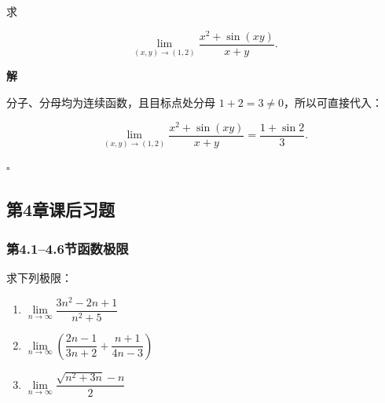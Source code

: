 \documentclass[fontset=fandol]{ctexart}
\newenvironment{solution}{\par\noindent\textbf{解}\quad}{\hfill$\square$\par\vspace{0.8em}}
\begin{document}
\begin{example}[利用连续性求极限]

	求

	\[

	\lim_{(x,y)\to(1,2)}

	\frac{x^2+\sin(xy)}{x+y}.

	\]

\end{example}

\begin{solution}

	分子、分母均为连续函数，且目标点处分母 \(1+2=3\neq0\)，所以可直接代入：

	\[

	\lim_{(x,y)\to(1,2)}

	\frac{x^2+\sin(xy)}{x+y}

	=\frac{1+\sin2}{3}.

	\]

\end{solution}









\iffalse



\subsection*{第4章课后习题}




\subsubsection*{第4.1--4.6节\quad 函数极限}



\begin{exercise}求下列极限：

\begin{enumerate}

\item \(\lim\limits_{n\to\infty} \dfrac{3n^2 - 2n + 1}{n^2 + 5}\)

\item \(\lim\limits_{n\to\infty} \left(\dfrac{2n-1}{3n+2} + \dfrac{n+1}{4n-3}\right)\)

\item \(\lim\limits_{n\to\infty} \dfrac{\sqrt{n^2 + 3n} - n}{2}\)

\end{enumerate}

\end{exercise}
\end{document}
